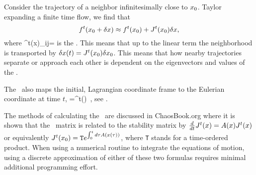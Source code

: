 \subsection{\jacobianM}

Consider the trajectory of a  neighbor infinitesimally close
to ${x_0}$. Taylor expanding a finite time flow, we find that
\[
f^t({x_0} +\delta x) \approx f^t({x_0})+J^t({x_0})\delta x,
\]
where
\beq
\jMps^t(x)_{ij}=
 is
the \jacobianM. This means that up to the linear term the
neighborhood is transported by $\delta x(t)=J^t({x_0})\delta
{x_0}$. This means that how nearby trajectories separate or
approach each other is dependent on the eigenvectors and
values of the \jacobianM.

The \jacobianM\ also maps the initial, Lagrangian coordinate
frame to the Eulerian coordinate at time $t$,
\beq
{}=\jMps^t(\xInit) \velField{\xInit}
\,,
see .

The methods of calculating the \jacobianM\ are discussed in ChaosBook.org where it is shown that the \jacobianM\ matrix is related to the stability matrix by $\frac{d}{dt} J^t(x)=A (x) J^t(x)$ or equivalently $J^t({x_0})= \texttt{T} e^{\int^t_0 d\tau A (x(\tau))}$, where \texttt{T} stands for a time-ordered product. When using a numerical routine to integrate the equations of motion, using a discrete approximation of either of these two formulas requires minimal additional programming effort.



